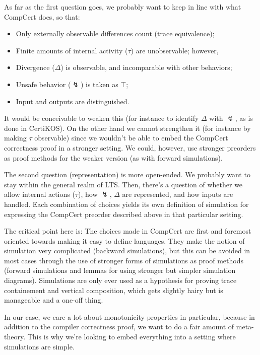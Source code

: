 \documentclass[11pt]{article}
\begin{document}
As far as the first question goes,
we probably want to keep in line with what CompCert does,
so that:
\begin{itemize}
\item Only externally observable differences count (trace equivalence);
\item Finite amounts of internal activity ($\tau$) are unobservable;
  however,
\item Divergence ($\Delta$) is observable,
  and incomparable with other behaviors;
\item Unsafe behavior ($\lightning$) is taken as $\top$;
\item Input and outputs are distinguished.
\end{itemize}
It would be conceivable to weaken this
(for instance to identify $\Delta$ with $\lightning$,
as is done in CertiKOS).
On the other hand we cannot strengthen it
(for instance by making $\tau$ observable)
since we wouldn't be able to embed
the CompCert correctness proof in a stronger setting.
We could, however,
use stronger preorders as proof methods
for the weaker version
(as with forward simulations).

The second question (representation) is more open-ended.
We probably want to stay within the general realm of LTS.
Then, there's a question of
whether we allow internal actions ($\tau$),
how $\lightning$, $\Delta$ are represented,
and how inputs are handled.
Each combination of choices yields
its own definition of simulation for
expressing the CompCert preorder described above
in that particular setting.

The critical point here is:
The choices made in CompCert
are first and foremost oriented towards
making it easy to define languages.
They make the notion of simulation
very complicated (backward simulations),
but this can be avoided in most cases
through the use of stronger forms of simulations
as proof methods
(forward simulations and
lemmas for using stronger but simpler simulation diagrams).
Simulations are only ever used as a hypothesis
for proving trace containement
and vertical composition,
which gets slightly hairy but is manageable
and a one-off thing.

In our case,
we care a lot about monotonicity properties in particular,
because in addition to the compiler correctness proof,
we want to do a fair amount of meta-theory.
This is why we're looking to embed everything
into a setting where simulations are simple.

\end{document}
